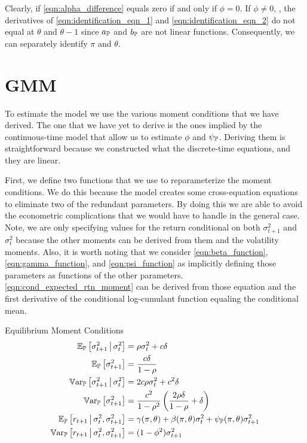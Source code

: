 \documentclass[11pt, letterpaper, twoside, final]{article}
\begin{document}
Clearly, if \cref{eqn:alpha_difference} equals zero if and only if $\phi = 0$.
If $\phi \neq 0$, , the derivatives of \cref{eqn:identification_eqn_1} and \cref{eqn:identification_eqn_2}  do not
equal at $\theta$ and $\theta-1$ since $a_{\mathbb{P}}$ and $b_{\mathbb{P}}$ are not linear functions.
Consequently, we can separately identify $\pi$ and $\theta$.

\section{GMM}\label{sec:GMM}

To estimate the model we use the various moment conditions that we have derived.
The one that we have yet to derive is the ones implied by the continuous-time model that allow us to estimate
$\phi$ and $\psi_{\mathbb{P}}$.
Deriving them is straightforward because we constructed what the discrete-time equations, and they are linear.

First, we define two functions that we use to reparameterize the moment conditions.
We do this because the model creates some cross-equation equations to eliminate two of the redundant parameters.
By doing this we are able to avoid the econometric complications that we would have to handle in the general
case.
Note, we are only specifying values for the return conditional on both $\sigma^2_{t+1}$ and $\sigma^2_t$ because
the other moments can be derived from them and the volatility moments.
Also, it is worth noting that we consider \cref{eqn:beta_function}, \cref{eqn:gamma_function}, and
\cref{eqn:psi_function} as implicitly defining those parameters as functions of the other parameters.
\cref{eqn:cond_expected_rtn_moment} can be derived from those equation and the first derivative of the conditional
log-cumulant function equaling the conditional mean.


\begin{defn}{Equilibrium Moment Conditions}
    \label{defn:equilibrium_moment_conditions}
    \begin{align}
        \label{eqn:cond_vol_mean}
        \E_{\PP}\left[\sigma^2_{t+1} \mvert \sigma^2_t \right]  &= \rho \sigma^2_t  + c \delta\\
%
        \label{eqn:global_vol_mean}
        \E_{\PP}\left[\sigma^2_{t+1}\right]  &= \frac{c \delta}{1 - \rho} \\
%
        \label{eqn:cond_vol_var}
        \Var_{\PP}\left[\sigma^2_{t+1} \mvert \sigma^2_t \right]  &=  2 c \rho \sigma^2_t  + c^2 \delta \\
%
        \label{eqn:global_vol_var}
        \Var_{\PP}\left[\sigma^2_{t+1} \right]  &=  \frac{c^2}{1 - \rho^2}  \left(\frac{2 \rho \delta}{1 - \rho}  +
        \delta \right)  \\
%
        \label{eqn:cond_expected_rtn_moment}
        \E_{\PP}\left[r_{t+1} \mvert \sigma^2_t, \sigma^2_{t+1}\right] &= \gamma(\pi, \theta) + \beta(\pi, \theta)
        \sigma^2_t + \psi_{\PP}(\pi, \theta) \sigma^2_{t+1} \\
%
        \label{eqn:cond_rtn_var}
        \Var_{\PP}\left[r_{t+1} \mvert \sigma^2_t, \sigma^2_{t+1}\right] &= (1 - \phi^2) \sigma^2_{t+1} 
\end{align}
\end{defn}
\end{document}
